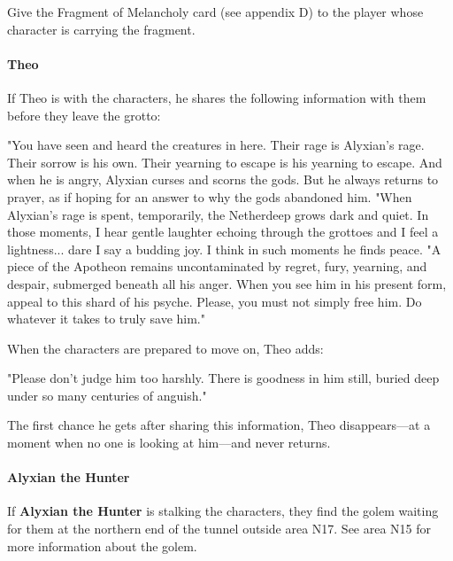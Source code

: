 \documentclass[10pt,a4,twoside,twocolumn,openany,nodeprecatedcode]{dndbook}
\begin{document}
Give the Fragment of Melancholy card (see appendix D) to the player whose character is carrying the fragment.
\paragraph{Theo}
If Theo is with the characters, he shares the following information with them before they leave the grotto:
\begin{DndReadAloud}{}
"You have seen and heard the creatures in here. Their rage is Alyxian's rage. Their sorrow is his own. Their yearning to escape is his yearning to escape. And when he is angry, Alyxian curses and scorns the gods. But he always returns to prayer, as if hoping for an answer to why the gods abandoned him.
"When Alyxian's rage is spent, temporarily, the Netherdeep grows dark and quiet. In those moments, I hear gentle laughter echoing through the grottoes and I feel a lightness... dare I say a budding joy. I think in such moments he finds peace.
"A piece of the Apotheon remains uncontaminated by regret, fury, yearning, and despair, submerged beneath all his anger. When you see him in his present form, appeal to this shard of his psyche. Please, you must not simply free him. Do whatever it takes to truly save him."
\end{DndReadAloud}

When the characters are prepared to move on, Theo adds:
\begin{DndReadAloud}{}
"Please don't judge him too harshly. There is goodness in him still, buried deep under so many centuries of anguish."
\end{DndReadAloud}

The first chance he gets after sharing this information, Theo disappears—at a moment when no one is looking at him—and never returns.
\paragraph{Alyxian the Hunter}
If \textbf{Alyxian the Hunter} is stalking the characters, they find the golem waiting for them at the northern end of the tunnel outside area N17. See area N15 for more information about the golem.
\end{document}
